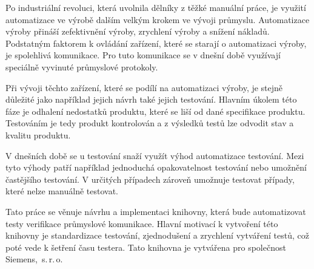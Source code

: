 \begin{introduction}
Po industriální revoluci, která uvolnila dělníky z těžké manuální práce, je využití automatizace ve výrobě dalším velkým krokem ve vývoji průmyslu.
Automatizace výroby přináší zefektivnění výroby, zrychlení výroby a snížení nákladů.
Podstatným faktorem k ovládání zařízení, které se starají o automatizaci výroby, je spolehlivá komunikace. Pro tuto komunikace se v dnešní době využívají speciálně vyvinuté průmyslové protokoly.  

Při vývoji těchto zařízení, které se podílí na automatizaci výroby, je stejně důležité jako například jejich návrh také jejich testování. Hlavním úkolem této fáze je odhalení nedostatků produktu, které se liší od dané specifikace produktu. Testováním je tedy produkt kontrolován a z výsledků testů lze odvodit stav a kvalitu produktu. 

V dnešních době se u testování snaží využít výhod automatizace testování. Mezi tyto výhody patří například jednoduchá opakovatelnost testování nebo umožnění častějšího testování. V určitých případech zároveň umožnuje testovat případy, které nelze manuálně testovat.

Tato práce se věnuje návrhu a implementaci knihovny, která bude automatizovat testy verifikace průmyslové komunikace. Hlavní motivací k vytvoření této knihovny je standardizace testování, zjednodušení a zrychlení vytváření testů, což poté vede k šetření času testera. Tato knihovna je vytvářena pro společnost Siemens,~s.\,{}r.\,{}o.

\end{introduction}
